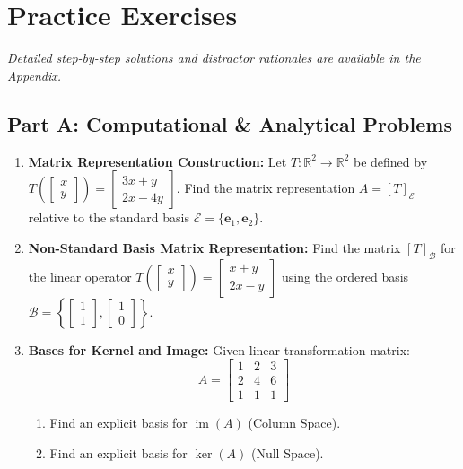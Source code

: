 \newpage
\section{Practice Exercises}
\textit{Detailed step-by-step solutions and distractor rationales are available in the Appendix.}

\subsection*{Part A: Computational \& Analytical Problems}
\begin{enumerate}
\item \textbf{Matrix Representation Construction:} Let $T: \mathbb{R}^2 \to \mathbb{R}^2$ be defined by $T\left(\begin{bmatrix} x \\ y \end{bmatrix}\right) = \begin{bmatrix} 3x + y \\ 2x - 4y \end{bmatrix}$. Find the matrix representation $A = [T]_{\mathcal{E}}$ relative to the standard basis $\mathcal{E} = \{\mathbf{e}_1, \mathbf{e}_2\}$.

\item \textbf{Non-Standard Basis Matrix Representation:} Find the matrix $[T]_{\mathcal{B}}$ for the linear operator $T\left(\begin{bmatrix} x \\ y \end{bmatrix}\right) = \begin{bmatrix} x + y \\ 2x - y \end{bmatrix}$ using the ordered basis $\mathcal{B} = \left\{ \begin{bmatrix} 1 \\ 1 \end{bmatrix}, \begin{bmatrix} 1 \\ 0 \end{bmatrix} \right\}$.

\item \textbf{Bases for Kernel and Image:} Given linear transformation matrix:
\begin{equation*}
A = \begin{bmatrix} 1 & 2 & 3 \\ 2 & 4 & 6 \\ 1 & 1 & 1 \end{bmatrix}
\end{equation*}
\begin{enumerate}
    \item Find an explicit basis for $\operatorname{im}(A)$ (Column Space).
    \item Find an explicit basis for $\ker(A)$ (Null Space).
\end{enumerate}


\end{enumerate}
